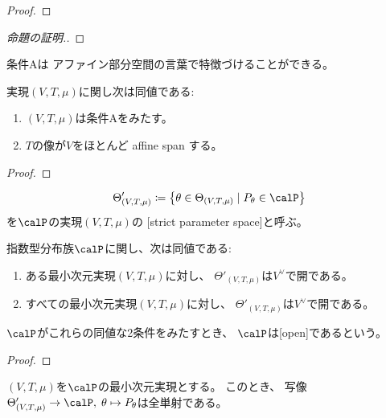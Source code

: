 \documentclass[report]{jlreq}
\begin{document}
\begin{proof}
    \TODO{}
\end{proof}

\begin{proof}[命題の証明.]
    \TODO{}
\end{proof}

条件Aは
アファイン部分空間の言葉で特徴づけることができる。

\begin{proposition}
    実現$(V, T, \mu)$に関し次は同値である:
    \begin{enumerate}
        \item $(V, T, \mu)$は条件Aをみたす。
        \item $T$の像が$V$をほとんど affine span する。
    \end{enumerate}
\end{proposition}

\begin{proof}
    \TODO{}
\end{proof}

\begin{definition}
    \begin{equation}
        \Theta'_{(V, T, \mu)} \coloneqq \mybrace{
            \theta \in \Theta_{(V, T, \mu)}
            \mid
            P_\theta \in \calP
        }
    \end{equation}
    を$\calP$の実現$(V, T, \mu)$の
    [strict parameter space]と呼ぶ。
\end{definition}

\begin{propdef}
    指数型分布族$\calP$に関し、次は同値である:
    \begin{enumerate}
        \item ある最小次元実現$(V, T, \mu)$に対し、
            $\Theta'_{(V, T, \mu)}$は$V^\vee$で開である。
        \item すべての最小次元実現$(V, T, \mu)$に対し、
            $\Theta'_{(V, T, \mu)}$は$V^\vee$で開である。
    \end{enumerate}
    $\calP$がこれらの同値な2条件をみたすとき、
    $\calP$は[open]であるという。
\end{propdef}

\begin{proof}
    \TODO{}
\end{proof}

\begin{proposition}
    $(V, T, \mu)$を$\calP$の最小次元実現とする。
    このとき、
    写像$\Theta'_{(V, T, \mu)} \to \calP, \;
        \theta \mapsto P_\theta$は全単射である。
\end{proposition}
\end{document}
